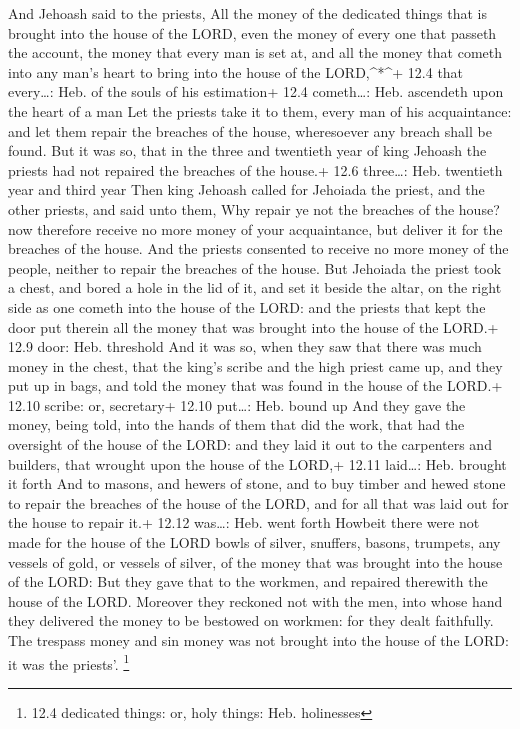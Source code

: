  And Jehoash said to the priests, All the money of the
dedicated things that is brought into the house of the LORD, even the
money of every one that passeth the account, the money that every man is
set at, and all the money that cometh into any man's heart to bring into
the house of the LORD,\^{}*\^{}+ 12.4 that every\ldots: Heb. of the
souls of his estimation+ 12.4 cometh\ldots: Heb. ascendeth upon the
heart of a man  Let the priests take it to them, every man
of his acquaintance: and let them repair the breaches of the house,
wheresoever any breach shall be found.  But it was so, that
in the three and twentieth year of king Jehoash the priests had not
repaired the breaches of the house.+ 12.6 three\ldots: Heb. twentieth
year and third year  Then king Jehoash called for Jehoiada
the priest, and the other priests, and said unto them, Why repair ye not
the breaches of the house? now therefore receive no more money of your
acquaintance, but deliver it for the breaches of the house. 
And the priests consented to receive no more money of the people,
neither to repair the breaches of the house.  But Jehoiada
the priest took a chest, and bored a hole in the lid of it, and set it
beside the altar, on the right side as one cometh into the house of the
LORD: and the priests that kept the door put therein all the money that
was brought into the house of the LORD.+ 12.9 door: Heb. threshold
 And it was so, when they saw that there was much money in
the chest, that the king's scribe and the high priest came up, and they
put up in bags, and told the money that was found in the house of the
LORD.+ 12.10 scribe: or, secretary+ 12.10 put\ldots: Heb. bound up
 And they gave the money, being told, into the hands of
them that did the work, that had the oversight of the house of the LORD:
and they laid it out to the carpenters and builders, that wrought upon
the house of the LORD,+ 12.11 laid\ldots: Heb. brought it forth
 And to masons, and hewers of stone, and to buy timber and
hewed stone to repair the breaches of the house of the LORD, and for all
that was laid out for the house to repair it.+ 12.12 was\ldots: Heb.
went forth  Howbeit there were not made for the house of
the LORD bowls of silver, snuffers, basons, trumpets, any vessels of
gold, or vessels of silver, of the money that was brought into the house
of the LORD:  But they gave that to the workmen, and
repaired therewith the house of the LORD.  Moreover they
reckoned not with the men, into whose hand they delivered the money to
be bestowed on workmen: for they dealt faithfully.  The
trespass money and sin money was not brought into the house of the LORD:
it was the priests'. \footnote{12.4 dedicated things: or, holy things:
  Heb. holinesses}


